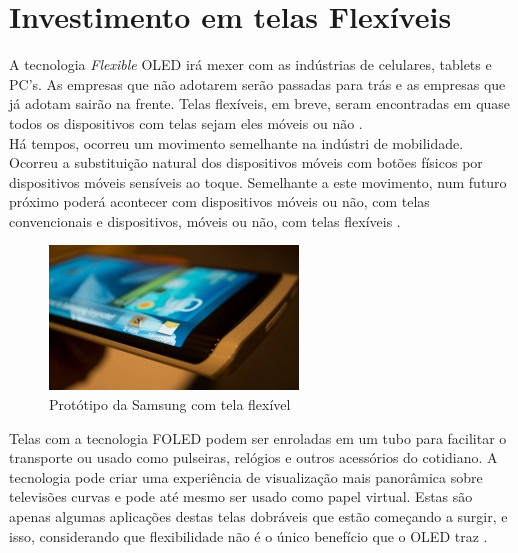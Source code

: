 \section{Investimento em telas Flexíveis}
\label{sec:investimento}

A tecnologia \textit{Flexible} OLED irá mexer com as indústrias de celulares, tablets e PC's. As empresas que não adotarem serão passadas para trás e as empresas que já adotam sairão na frente. Telas flexíveis, em breve, seram encontradas em quase todos os dispositivos com telas sejam eles móveis ou não \cite{FSIJS}.\\

Há tempos, ocorreu um movimento semelhante na indústri de mobilidade. Ocorreu a substituição natural dos dispositivos móveis com botões físicos por dispositivos móveis sensíveis ao toque. Semelhante a este movimento, num futuro próximo poderá acontecer com dispositivos móveis ou não, com telas convencionais e dispositivos, móveis ou não, com telas flexíveis \cite{FSIJS}.\\

\begin{figure}[!ht]
  \centering
  \includegraphics[width=.70\textwidth]{./figuras/oled-samsung-device} 
  \caption{Protótipo da Samsung com tela flexível}
  \label{fig:oled-samsung-device} 
\end{figure}

Telas com a tecnologia FOLED podem ser enroladas em um tubo para facilitar o transporte ou usado como pulseiras, relógios e outros acessórios do cotidiano. A tecnologia pode criar uma experiência de visualização mais panorâmica sobre televisões curvas e pode até mesmo ser usado como papel virtual. Estas são apenas algumas aplicações destas telas dobráveis que estão começando a surgir, e isso, considerando que flexibilidade não é o único benefício que o OLED traz \cite{FSIJS}.\\

